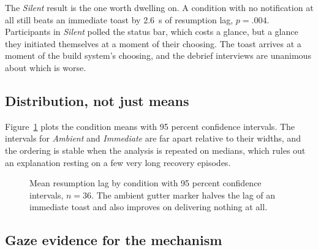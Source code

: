The \emph{Silent} result is the one worth dwelling on. A condition with no
notification at all still beats an immediate toast by 2.6~s of resumption lag,
$p = .004$. Participants in \emph{Silent} polled the status bar, which costs a
glance, but a glance they initiated themselves at a moment of their choosing.
The toast arrives at a moment of the build system's choosing, and the debrief
interviews are unanimous about which is worse.

\subsection{Distribution, not just means}

Figure~\ref{fig:lag} plots the condition means with 95 percent confidence
intervals. The intervals for \emph{Ambient} and \emph{Immediate} are far apart
relative to their widths, and the ordering is stable when the analysis is
repeated on medians, which rules out an explanation resting on a few very long
recovery episodes.

\begin{figure}[t]
  \centering
  \caption{Mean resumption lag by condition with 95 percent confidence
  intervals, $n = 36$. The ambient gutter marker halves the lag of an immediate
  toast and also improves on delivering nothing at all.}
  \label{fig:lag}
\end{figure}

\subsection{Gaze evidence for the mechanism}

